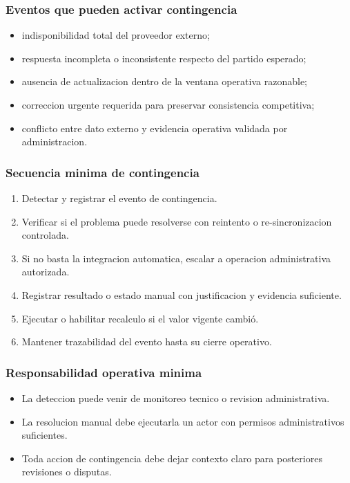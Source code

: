 \subsubsection{Eventos que pueden activar contingencia}

\begin{itemize}
  \item indisponibilidad total del proveedor externo;
  \item respuesta incompleta o inconsistente respecto del partido esperado;
  \item ausencia de actualizacion dentro de la ventana operativa razonable;
  \item correccion urgente requerida para preservar consistencia competitiva;
  \item conflicto entre dato externo y evidencia operativa validada por administracion.
\end{itemize}

\subsubsection{Secuencia minima de contingencia}

\begin{enumerate}
  \item Detectar y registrar el evento de contingencia.
  \item Verificar si el problema puede resolverse con reintento o re-sincronizacion controlada.
  \item Si no basta la integracion automatica, escalar a operacion administrativa autorizada.
  \item Registrar resultado o estado manual con justificacion y evidencia suficiente.
  \item Ejecutar o habilitar recalculo si el valor vigente cambió.
  \item Mantener trazabilidad del evento hasta su cierre operativo.
\end{enumerate}

\subsubsection{Responsabilidad operativa minima}

\begin{itemize}
  \item La deteccion puede venir de monitoreo tecnico o revision administrativa.
  \item La resolucion manual debe ejecutarla un actor con permisos administrativos suficientes.
  \item Toda accion de contingencia debe dejar contexto claro para posteriores revisiones o disputas.
\end{itemize}

